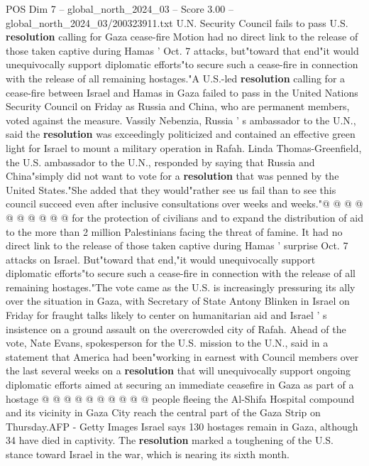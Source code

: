 \begin{textsample}{POS Dim 7 – global\_north\_2024\_03 – Score 3.00 – global\_north\_2024\_03/200323911.txt}  \label{ex:f7_pos_213}
U.N.
Security Council fails to pass U.S. \textbf{resolution} calling for Gaza cease-fire Motion had no direct link to the release of those taken captive during Hamas ' Oct. 7 attacks, but"toward that end"it would unequivocally support diplomatic efforts"to secure such a cease-fire in connection with the release of all remaining hostages."A U.S.-led \textbf{resolution} calling for a cease-fire between Israel and Hamas in Gaza failed to pass in the United Nations Security Council on Friday as Russia and China, who are permanent members, voted against the measure.
Vassily Nebenzia, Russia ' s ambassador to the U.N., said the \textbf{resolution} was exceedingly politicized and contained an effective green light for Israel to mount a military operation in Rafah.
Linda Thomas-Greenfield, the U.S. ambassador to the U.N., responded by saying that Russia and China"simply did not want to vote for a \textbf{resolution} that was penned by the United States."She added that they would"rather see us fail than to see this council succeed even after inclusive consultations over weeks and weeks."@ @ @ @ @ @ @ @ @ @ for the protection of civilians and to expand the distribution of aid to the more than 2 million Palestinians facing the threat of famine.
It had no direct link to the release of those taken captive during Hamas ' surprise Oct. 7 attacks on Israel.
But"toward that end,"it would unequivocally support diplomatic efforts"to secure such a cease-fire in connection with the release of all remaining hostages."The vote came as the U.S. is increasingly pressuring its ally over the situation in Gaza, with Secretary of State Antony Blinken in Israel on Friday for fraught talks likely to center on humanitarian aid and Israel ' s insistence on a ground assault on the overcrowded city of Rafah.
Ahead of the vote, Nate Evans, spokesperson for the U.S. mission to the U.N., said in a statement that America had been"working in earnest with Council members over the last several weeks on a \textbf{resolution} that will unequivocally support ongoing diplomatic efforts aimed at securing an immediate ceasefire in Gaza as part of a hostage @ @ @ @ @ @ @ @ @ @ people fleeing the Al-Shifa Hospital compound and its vicinity in Gaza City reach the central part of the Gaza Strip on Thursday.AFP - Getty Images Israel says 130 hostages remain in Gaza, although 34 have died in captivity.
The \textbf{resolution} marked a toughening of the U.S. stance toward Israel in the war, which is nearing its sixth month.

\end{textsample}
